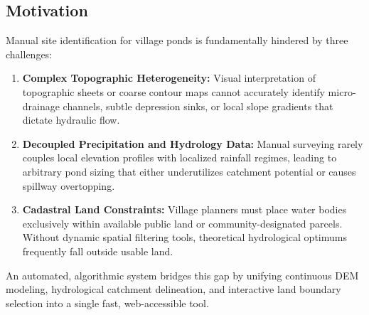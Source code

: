 \documentclass[manuscript,screen,review]{acmart}
\begin{document}
\subsection{Motivation}
Manual site identification for village ponds is fundamentally hindered by three challenges:
\begin{enumerate}
    \item \textbf{Complex Topographic Heterogeneity:} Visual interpretation of topographic sheets or coarse contour maps cannot accurately identify micro-drainage channels, subtle depression sinks, or local slope gradients that dictate hydraulic flow.
    \item \textbf{Decoupled Precipitation and Hydrology Data:} Manual surveying rarely couples local elevation profiles with localized rainfall regimes, leading to arbitrary pond sizing that either underutilizes catchment potential or causes spillway overtopping.
    \item \textbf{Cadastral Land Constraints:} Village planners must place water bodies exclusively within available public land or community-designated parcels. Without dynamic spatial filtering tools, theoretical hydrological optimums frequently fall outside usable land.
\end{enumerate}
An automated, algorithmic system bridges this gap by unifying continuous DEM modeling, hydrological catchment delineation, and interactive land boundary selection into a single fast, web-accessible tool.
\end{document}
